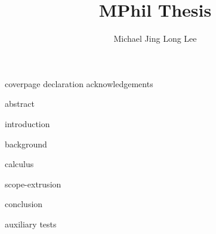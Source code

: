 \documentclass[12pt,a4paper,twoside,openany,BCOR=2cm]{scrbook}
\title{MPhil Thesis}
\author{Michael Jing Long Lee}
\begin{document}

\frontmatter
{
{coverpage}
{declaration}
{acknowledgements}

{abstract}

\hypersetup{linkcolor=black, linkbordercolor=white}
\tableofcontents

 }

\mainmatter
{introduction}

{background}

{calculus}

{scope-extrusion}


{conclusion}



\appendix

{auxiliary}
{tests}
\end{document}
